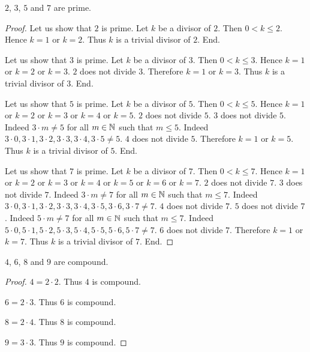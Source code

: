 \documentclass[../arithmetic.tex]{subfiles}
\begin{document}
  \begin{forthel}
    \begin{proposition}
      $2$, $3$, $5$ and $7$ are prime.
    \end{proposition}
    \begin{proof}
      Let us show that $2$ is prime.
        Let $k$ be a divisor of $2$.
        Then $0 \less k \leq 2$.
        Hence $k = 1$ or $k = 2$.
        Thus $k$ is a trivial divisor of $2$.
      End.

      Let us show that $3$ is prime.
        Let $k$ be a divisor of $3$.
        Then $0 \less k \leq 3$.
        Hence $k = 1$ or $k = 2$ or $k = 3$.
        $2$ does not divide $3$.
        Therefore $k = 1$ or $k = 3$.
        Thus $k$ is a trivial divisor of $3$.
      End.

      Let us show that $5$ is prime.
        Let $k$ be a divisor of $5$.
        Then $0 \less k \leq 5$.
        Hence $k = 1$ or $k = 2$ or $k = 3$ or $k = 4$ or $k = 5$.
        $2$ does not divide $5$.
        $3$ does not divide $5$.
        Indeed $3 \cdot m \neq 5$ for all $m \in \mathbb{N}$ such that $m \leq 5$.
        Indeed $3 \cdot 0, 3 \cdot 1, 3 \cdot 2, 3 \cdot 3, 3 \cdot 4, 3 \cdot 5
        \neq 5$.
        $4$ does not divide $5$.
        Therefore $k = 1$ or $k = 5$.
        Thus $k$ is a trivial divisor of $5$.
      End.

      Let us show that $7$ is prime.
        Let $k$ be a divisor of $7$.
        Then $0 \less k \leq 7$.
        Hence $k = 1$ or $k = 2$ or $k = 3$ or $k = 4$ or $k = 5$ or $k = 6$ or
        $k = 7$.
        $2$ does not divide $7$.
        $3$ does not divide $7$.
        Indeed $3 \cdot m \neq 7$ for all $m \in \mathbb{N}$ such that $m \leq 7$.
        Indeed $3\cdot 0, 3\cdot 1, 3 \cdot 2, 3 \cdot 3, 3 \cdot 4, 3 \cdot 5,
        3 \cdot 6, 3 \cdot 7 \neq 7$.
        $4$ does not divide $7$.
        $5$ does not divide $7$.
        Indeed $5 \cdot m \neq 7$ for all $m \in \mathbb{N}$ such that $m \leq 7$.
        Indeed $5 \cdot 0, 5\cdot 1, 5 \cdot 2, 5 \cdot 3, 5 \cdot 4, 5 \cdot 5,
        5 \cdot 6, 5 \cdot 7 \neq 7$.
        $6$ does not divide $7$.
        Therefore $k = 1$ or $k = 7$.
        Thus $k$ is a trivial divisor of $7$.
      End.
    \end{proof}
  \end{forthel}

  \begin{forthel}
    \begin{proposition}
      $4$, $6$, $8$ and $9$ are compound.
    \end{proposition}
    \begin{proof}
      $4 = 2 \cdot 2$.
      Thus $4$ is compound.

      $6 = 2 \cdot 3$.
      Thus $6$ is compound.

      $8 = 2 \cdot 4$.
      Thus $8$ is compound.

      $9 = 3 \cdot 3$.
      Thus $9$ is compound.
    \end{proof}
  \end{forthel}
\end{document}
